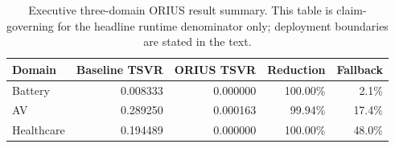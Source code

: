 \begin{table}[htbp]
\centering
\small
\caption{Executive three-domain ORIUS result summary. This table is claim-governing for the headline runtime denominator only; deployment boundaries are stated in the text.}
\label{tab:executive-runtime-evidence}
\begin{tabular}{lrrrr}
\toprule
Domain & Baseline TSVR & ORIUS TSVR & Reduction & Fallback\\
\midrule
Battery & 0.008333 & 0.000000 & 100.00\% & 2.1\%\\
AV & 0.289250 & 0.000163 & 99.94\% & 17.4\%\\
Healthcare & 0.194489 & 0.000000 & 100.00\% & 48.0\%\\
\bottomrule
\end{tabular}
\end{table}
